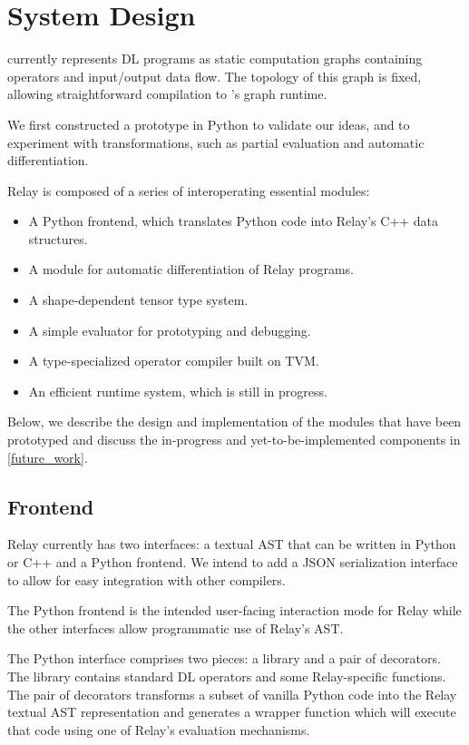 \section{System Design}

\nnvm currently represents DL programs as static computation graphs
containing operators and input/output data flow. The topology of this graph is fixed,
allowing straightforward compilation to \tvm's graph runtime.

We first constructed a prototype in Python to validate our ideas, and to
experiment with transformations, such as partial evaluation and automatic
differentiation.

Relay is composed of a series of interoperating essential modules:

\begin{itemize}
\item A Python frontend, which translates Python code into Relay's C++ data structures.
\item A module for automatic differentiation of Relay programs.
\item A shape-dependent tensor type system.
\item A simple evaluator for prototyping and debugging.
\item A type-specialized operator compiler built on TVM.
\item An efficient runtime system, which is still in progress.
\end{itemize}

Below, we describe the design and implementation of the modules that have been prototyped and
discuss the in-progress and yet-to-be-implemented components in \ref{future_work}.

\subsection{Frontend}

Relay currently has two interfaces: a textual AST that can be written in Python or C++ and a Python frontend. We intend to add a JSON serialization interface to allow for easy integration with other compilers.

The Python frontend is the intended user-facing interaction
mode for Relay while the other interfaces allow programmatic use of Relay's AST.

The Python interface comprises two pieces: a library and a pair of decorators. The library contains standard DL operators and some Relay-specific functions. The pair of decorators transforms a subset of vanilla Python
code into the Relay textual AST representation and generates a wrapper function
which will execute that code using one of Relay's evaluation mechanisms.

